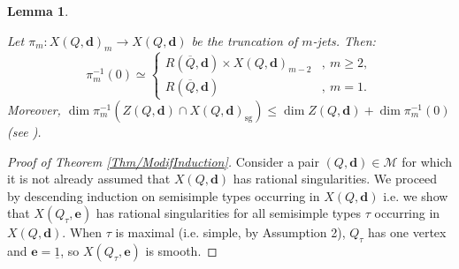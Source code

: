 \documentclass[11pt,english]{article}
\numberwithin{equation}{section}
\numberwithin{figure}{section}
\theoremstyle{definition}
\theoremstyle{plain}
\newtheorem{lem}[df]{Lemma}
\theoremstyle{remark}
\DeclareMathOperator{\sg}{sg}
\newcommand\dd{\mathbf{d}}
\newcommand\ee{\mathbf{e}}
\begin{document}
\begin{lem}{\cite[Lem. 3.3. - Proof of Lem. 3.4.]{Bud21}} \label{Lem/JetsMomMap}

Let $\pi_{m}:X(Q,\dd)_{m}\rightarrow X(Q,\dd)$ be the truncation
of $m$-jets. Then:\[
\pi_m^{-1}(0)\simeq
\left\{
\begin{array}{ll}
R(\overline{Q},\dd)\times X(Q,\dd)_{m-2} & ,\ m\geq2, \\
R(\overline{Q},\dd) & ,\ m=1.
\end{array}
\right.
\]Moreover, $\dim\pi_{m}^{-1}(Z(Q,\dd)\cap X(Q,\dd)_{\sg})\leq\dim Z(Q,\dd)+\dim\pi_{m}^{-1}(0)$
(see \cite[Proof of Lem. 3.4. - Eqn. (10)]{Bud21}).

\end{lem}

\begin{proof}[Proof of Theorem \ref{Thm/ModifInduction}]

Consider a pair $(Q,\dd)\in\mathcal{M}$ for which it is not already
assumed that $X(Q,\dd)$ has rational singularities. We proceed by
descending induction on semisimple types occurring in $X(Q,\dd)$
i.e. we show that $X(Q_{\tau},\ee)$ has rational singularities for
all semisimple types $\tau$ occurring in $X(Q,\dd)$. When $\tau$
is maximal (i.e. simple, by Assumption 2), $Q_{\tau}$ has one vertex
and $\ee=\underline{1}$, so $X(Q_{\tau},\ee)$ is smooth.


\end{proof}
\end{document}
